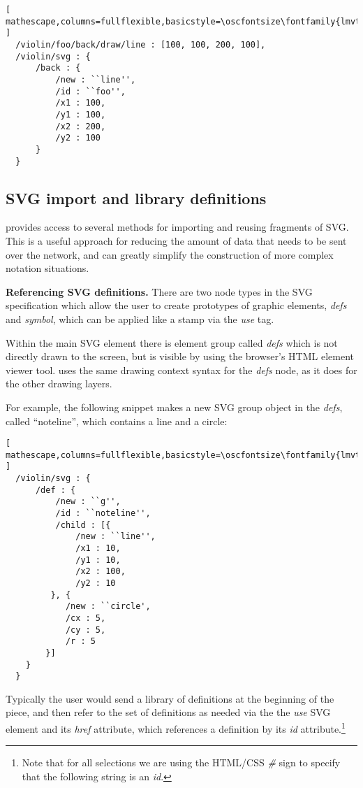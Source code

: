 \begin{lstlisting}[ mathescape,columns=fullflexible,basicstyle=\oscfontsize\fontfamily{lmvtt}\selectfont ]
  /violin/foo/back/draw/line : [100, 100, 200, 100],
  /violin/svg : {
      /back : {
          /new : ``line'',
          /id : ``foo'',
          /x1 : 100,
          /y1 : 100,
          /x2 : 200,
          /y2 : 100
      }
  }
 \end{lstlisting}


\subsection{SVG import and library definitions}\label{sec:defs}
\drawsocket provides access to several methods for importing and reusing fragments of SVG.
This is a useful approach for reducing the amount of data that needs to be sent over the network, and can greatly simplify the construction of more complex notation situations.

\medskip
\noindent
\textbf{Referencing SVG definitions.} 
There are two node types in the SVG specification which allow the user to create prototypes of graphic elements, \textit{defs} and \textit{symbol}, which can be applied like a stamp via the \textit{use} tag. 

Within the \drawsocket main SVG element there is element group called \textit{defs} which is not directly drawn to the screen, but is visible by using the browser's HTML element viewer tool.
\drawsocket uses the same drawing context syntax for the \textit{defs} node, as it does for the other drawing layers.

For example, the following snippet makes a new SVG group object in the \textit{defs}, called ``noteline'', which contains a line and a circle:

\begin{lstlisting}[ mathescape,columns=fullflexible,basicstyle=\oscfontsize\fontfamily{lmvtt}\selectfont ]
  /violin/svg : {
      /def : {
          /new : ``g'',
          /id : ``noteline'',
          /child : [{
              /new : ``line'',
              /x1 : 10,
              /y1 : 10,
              /x2 : 100,
              /y2 : 10
         }, {
            /new : ``circle',
            /cx : 5,
            /cy : 5,
            /r : 5
        }]
    } 
  }
 \end{lstlisting}

Typically the user would send a library of definitions at the beginning of the piece, and then refer to the set of definitions as needed via the the \textit{use} SVG element and its \textit{href} attribute, which references a definition by its \textit{id} attribute.\footnote{Note that for all selections we are using the HTML/CSS \textit{\#} sign to specify that the following string is an \textit{id}.}

